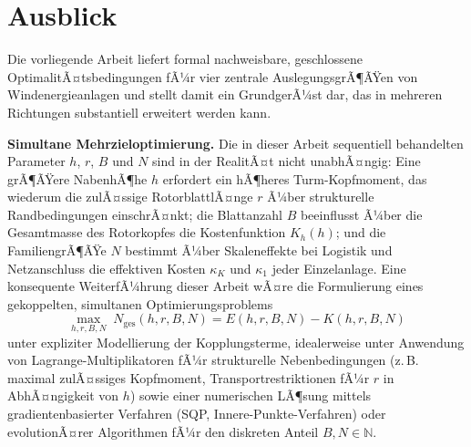 ﻿\documentclass[a4paper,12pt]{article}
\theoremstyle{definition}
\begin{document}
\section{Ausblick}

Die vorliegende Arbeit liefert formal nachweisbare, geschlossene OptimalitÃ¤tsbedingungen fÃ¼r vier zentrale AuslegungsgrÃ¶ÃŸen von Windenergieanlagen und stellt damit ein GrundgerÃ¼st dar, das in mehreren Richtungen substantiell erweitert werden kann.

\textbf{Simultane Mehrzieloptimierung.} Die in dieser Arbeit sequentiell behandelten Parameter $h$, $r$, $B$ und $N$ sind in der RealitÃ¤t nicht unabhÃ¤ngig: Eine grÃ¶ÃŸere NabenhÃ¶he $h$ erfordert ein hÃ¶heres Turm-Kopfmoment, das wiederum die zulÃ¤ssige RotorblattlÃ¤nge $r$ Ã¼ber strukturelle Randbedingungen einschrÃ¤nkt; die Blattanzahl $B$ beeinflusst Ã¼ber die Gesamtmasse des Rotorkopfes die Kostenfunktion $K_h(h)$; und die FamiliengrÃ¶ÃŸe $N$ bestimmt Ã¼ber Skaleneffekte bei Logistik und Netzanschluss die effektiven Kosten $\kappa_K$ und $\kappa_1$ jeder Einzelanlage. Eine konsequente WeiterfÃ¼hrung dieser Arbeit wÃ¤re die Formulierung eines gekoppelten, simultanen Optimierungsproblems
\[
\max_{h,r,B,N} \; N_{\mathrm{ges}}(h,r,B,N) = E(h,r,B,N) - K(h,r,B,N)
\]
unter expliziter Modellierung der Kopplungsterme, idealerweise unter Anwendung von Lagrange-Multiplikatoren fÃ¼r strukturelle Nebenbedingungen (z.\,B. maximal zulÃ¤ssiges Kopfmoment, Transportrestriktionen fÃ¼r $r$ in AbhÃ¤ngigkeit von $h$) sowie einer numerischen LÃ¶sung mittels gradientenbasierter Verfahren (SQP, Innere-Punkte-Verfahren) oder evolutionÃ¤rer Algorithmen fÃ¼r den diskreten Anteil $B,N\in\mathbb{N}$.
\end{document}
